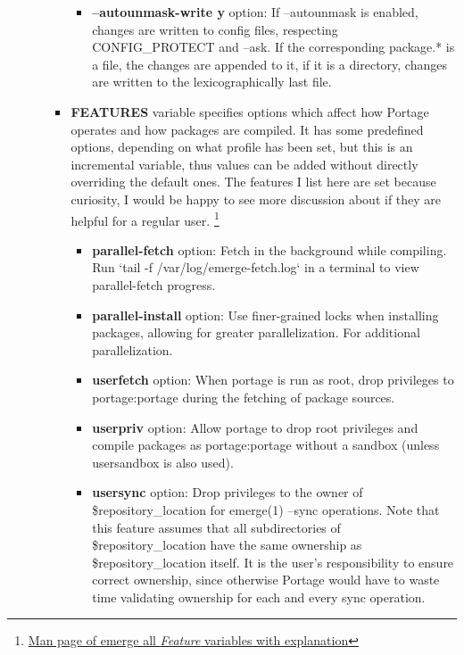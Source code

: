 \documentclass[10pt,a4paper]{article}
\begin{document}
\begin{enumerate}
\begin{enumerate}[label*=\arabic*.]
\begin{itemize}
\begin{itemize}[label={o}]
					\item \textbf{--autounmask-write y} option: If --autounmask is enabled, changes are written to config files, respecting CONFIG\_PROTECT and --ask. If the corresponding package.* is a file, the changes are appended to it, if it is a directory, changes are written to the lexicographically last file.
					
				\end{itemize}
				
				\item \textbf{FEATURES} variable specifies options which affect how Portage operates and how packages are compiled. It has some predefined options, depending on what profile has been set, but this is an incremental variable, thus values can be added without directly overriding the default ones. The features I list here are set because curiosity, I would be happy to see more discussion about if they are helpful for a regular user. \footnote{ \href{https://dev.gentoo.org/~zmedico/portage/doc/man/make.conf.5.html}{Man page of emerge all \textit{Feature} variables with explanation}}

				

				\begin{itemize}[label={o}]
					
					\item \textbf{parallel-fetch} option: Fetch in the background while compiling. Run `tail -f /var/log/emerge-fetch.log` in a terminal to view parallel-fetch progress.
					
					\item \textbf{parallel-install} option: Use finer-grained locks when installing packages, allowing for greater parallelization. For additional parallelization.
					
					\item \textbf{userfetch} option: When portage is run as root, drop privileges to portage:portage during the fetching of package sources.
					
					\item \textbf{userpriv} option: Allow portage to drop root privileges and compile packages as portage:portage without a sandbox (unless usersandbox is also used).
					
					\item \textbf{usersync} option: Drop privileges to the owner of \${repository\_location} for emerge(1) --sync operations. Note that this feature assumes that all subdirectories of \${repository\_location} have the same ownership as \${repository\_location} itself. It is the user's responsibility to ensure correct ownership, since otherwise Portage would have to waste time validating ownership for each and every sync operation.
					

\end{itemize}
\end{itemize}
\end{enumerate}
\end{enumerate}
\end{document}
